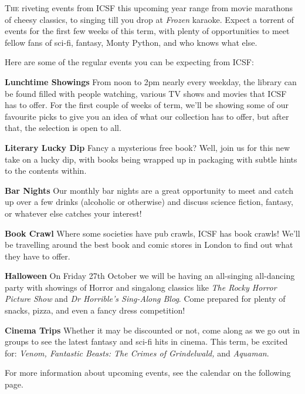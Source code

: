 \lettrine[lines=3]{T}{he} riveting events from ICSF this upcoming year range from movie marathons of cheesy classics, to singing till you drop at \textit{Frozen} karaoke. Expect a torrent of events for the first few weeks of this term, with plenty of opportunities to meet fellow fans of sci-fi, fantasy, Monty Python, and who knows what else.

Here are some of the regular events you can be expecting from ICSF:

\textbf{Lunchtime Showings} \textemdash{}
From noon to 2pm nearly every weekday, the library can be found filled with people watching, various TV shows and movies that ICSF has to offer. For the first couple of weeks of term, we’ll be showing some of our favourite picks to give you an idea of what our collection has to offer, but after that, the selection is open to all.

\textbf{Literary Lucky Dip} \textemdash{}
Fancy a mysterious free book? Well, join us for this new take on a lucky dip, with books being wrapped up in packaging with subtle hints to the contents within.

\textbf{Bar Nights} \textemdash{}
Our monthly bar nights are a great opportunity to meet and catch up over a few drinks (alcoholic or otherwise) and discuss science fiction, fantasy, or whatever else catches your interest!

\textbf{Book Crawl} \textemdash{}
Where some societies have pub crawls, ICSF has book crawls! We’ll be travelling around the best book and comic stores in London to find out what they have to offer.

\textbf{Halloween} \textemdash{}
On Friday 27th October we will be having an all-singing all-dancing party with showings of Horror and singalong classics like \textit{The Rocky Horror Picture Show} and \textit{Dr Horrible’s Sing-Along Blog}. Come prepared for plenty of snacks, pizza, and even a fancy dress competition!

\textbf{Cinema Trips} \textemdash{}
Whether it may be discounted or not, come along as we go out in groups to see the latest fantasy and sci-fi hits in cinema. This term, be excited for: \textit{Venom, Fantastic Beasts: The Crimes of Grindelwald,} and \textit{Aquaman}.

For more information about upcoming events, see the calendar on the following page.
